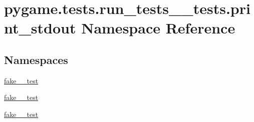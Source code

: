 \hypertarget{namespacepygame_1_1tests_1_1run__tests____tests_1_1print__stdout}{}\section{pygame.\+tests.\+run\+\_\+tests\+\_\+\+\_\+tests.\+print\+\_\+stdout Namespace Reference}
\label{namespacepygame_1_1tests_1_1run__tests____tests_1_1print__stdout}
\subsection*{Namespaces}
\begin{DoxyCompactItemize}
\item 
 \hyperlink{namespacepygame_1_1tests_1_1run__tests____tests_1_1print__stdout_1_1fake__2__test}{fake\+\_\+\_\+test}
\item 
 \hyperlink{namespacepygame_1_1tests_1_1run__tests____tests_1_1print__stdout_1_1fake__3__test}{fake\+\_\+\_\+test}
\item 
 \hyperlink{namespacepygame_1_1tests_1_1run__tests____tests_1_1print__stdout_1_1fake__4__test}{fake\+\_\+\_\+test}
\end{DoxyCompactItemize}
